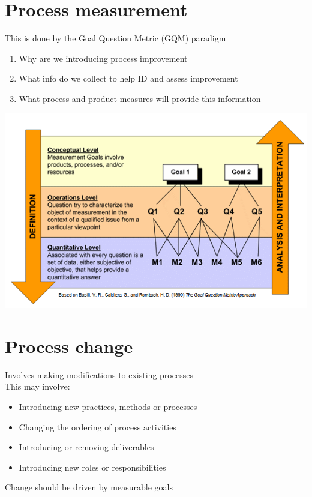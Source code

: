 \documentclass{article}[18pt]
\begin{document}
\section{Process measurement}
This is done by the Goal Question Metric (GQM) paradigm
\begin{enumerate}
	\item Why are we introducing process improvement
	\item What info do we collect to help ID and assess improvement
	\item What process and product measures will provide this information
\end{enumerate}
\begin{center}
	\includegraphics[scale=0.7]{GQM}
\end{center}
\section{Process change}
Involves making modifications to existing processes\\
This may involve:
\begin{itemize}
	\item Introducing new practices, methods or processes
	\item Changing the ordering of process activities
	\item Introducing or removing deliverables
	\item Introducing new roles or responsibilities
\end{itemize}
Change should be driven by measurable goals
\end{document}
